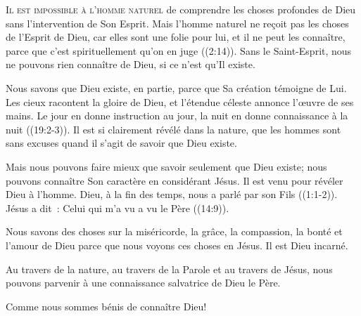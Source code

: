

\lettrine{I}{l est impossible à l'homme naturel} de comprendre
 les choses profondes de Dieu sans l'intervention de Son Esprit.
 \og Mais l'homme naturel ne reçoit pas les choses de l'Esprit de Dieu,
 car elles sont une folie pour lui, et il ne peut les connaître,
 parce que c'est spirituellement qu'on en juge \fg{}
 ((2:14)).
 Sans le Saint-Esprit, nous ne pouvons rien connaître de Dieu,
 si ce n'est qu'Il existe.

Nous savons que Dieu existe, en partie, parce que Sa création
 témoigne de Lui. \og Les cieux racontent la gloire de Dieu,
 et l'étendue céleste annonce l'œuvre de ses mains.
 Le jour en donne instruction au jour, la nuit en donne connaissance
 à la nuit \fg{} ((19:2-3)).
 Il est si clairement révélé dans la nature, que les hommes sont
 sans excuses quand il s'agit de savoir que Dieu existe.

Mais nous pouvons faire mieux que savoir seulement que Dieu existe;
 nous pouvons connaître Son caractère en considérant Jésus.
 Il est venu pour révéler Dieu à l'homme.
 \og Dieu, à la fin des temps, nous a parlé par son Fils \fg{}
 ((1:1-2)).
 Jésus a dit~: 
 \og Celui qui m'a vu a vu le Père \fg{} ((14:9)).

Nous savons des choses sur la miséricorde, la grâce, la compassion,
 la bonté et l'amour de Dieu parce que nous voyons ces choses en Jésus.
 Il est Dieu incarné.

Au travers de la nature, au travers de la Parole et au travers de Jésus,
 nous pouvons parvenir à une connaissance salvatrice de Dieu le Père.


Comme nous sommes bénis de connaître Dieu!

\dvrule




